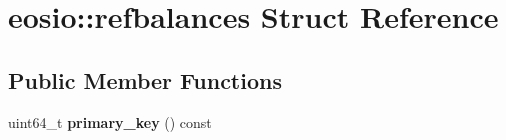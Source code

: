 \hypertarget{structeosio_1_1refbalances}{}\section{eosio\+:\+:refbalances Struct Reference}
\label{structeosio_1_1refbalances}
\subsection*{Public Member Functions}
\begin{DoxyCompactItemize}
\item 
\mbox{\label{structeosio_1_1refbalances_abe2ec5b1cb3699f66a4697a7320ba989}} 
uint64\+\_\+t {\bfseries primary\+\_\+key} () const
\end{DoxyCompactItemize}
